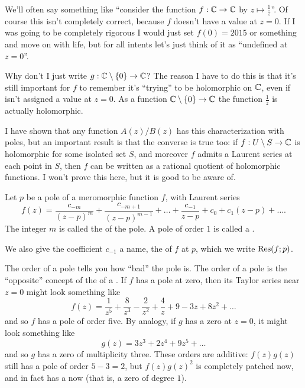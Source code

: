 \begin{abuse}
	We'll often say something like
	``consider the function $f : \mathbb C \to \mathbb C$
	by $z \mapsto \frac 1z$''.
	Of course this isn't completely correct,
	because $f$ doesn't have a value at $z=0$.
	If I was going to be completely rigorous
	I would just set $f(0) = 2015$ or something and move on
	with life, but for all intents
	let's just think of it as ``undefined at $z=0$''.

	Why don't I just write $g : \mathbb C \setminus \{0\} \to \mathbb C$?
	The reason I have to do this is that it's still important
	for $f$ to remember it's ``trying'' to be holomorphic on $\mathbb C$,
	even if isn't assigned a value at $z=0$.
	As a function $\mathbb C \setminus \{0\} \to \mathbb C$ the function $\frac 1z$ is actually holomorphic.
\end{abuse}

\begin{remark}
	I have shown that any function $A(z)/B(z)$
	has this characterization with poles,
	but an important result is
	that the converse is true too:
	if $f : U \setminus S \to \mathbb C$ is holomorphic for some isolated set $S$,
	and moreover $f$ admits a Laurent series at each point in $S$,
	then $f$ can be written as a rational quotient of holomorphic functions.
	I won't prove this here, but it is good to be aware of.
\end{remark}

\begin{definition}
	Let $p$ be a pole of a meromorphic function $f$, with Laurent series
	\[
		f(z) =
		\frac{c_{-m}}{(z-p)^m}
		+ \frac{c_{-m+1}}{(z-p)^{m-1}}
		+ \dots
		+ \frac{c_{-1}}{z-p} + c_0 + c_1 (z-p) + \dots.
	\]
	The integer $m$ is called the  of the pole.
	A pole of order $1$ is called a .

	We also give the coefficient $c_{-1}$ a name, the  of $f$ at $p$,
	which we write $\operatorname{Res}(f;p)$.
\end{definition}

The order of a pole tells you how ``bad'' the pole is.
The order of a pole is the ``opposite'' concept of the  of a .
If $f$ has a pole at zero, then its Taylor series near $z=0$ might look something like
\[ f(z) = \frac{1}{z^5} + \frac{8}{z^3} - \frac{2}{z^2} + \frac{4}{z} + 9 - 3z + 8z^2 + \dots \]
and so $f$ has a pole of order five.
By analogy, if $g$ has a zero at $z=0$, it might look something like
\[ g(z) = 3z^3 + 2z^4 + 9z^5 + \dots \]
and so $g$ has a zero of multiplicity three.
These orders are additive: $f(z) g(z)$ still has a pole of order $5-3=2$,
but $f(z)g(z)^2$ is completely patched now, and in fact has a  now
(that is, a zero of degree $1$).

